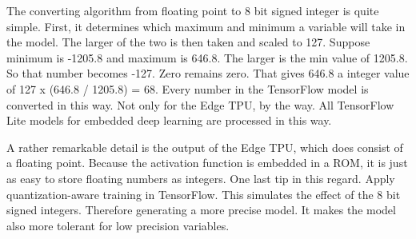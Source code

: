The converting algorithm from floating point to 8 bit signed integer is quite simple. First, it determines which maximum and minimum a variable will take in the model. The larger of the two is then taken and scaled to 127. Suppose minimum is -1205.8 and maximum is 646.8. The larger is the min value of 1205.8. So that number becomes -127. Zero remains zero. That gives 646.8 a integer value of 127 x (646.8 / 1205.8)  = 68. Every number in the TensorFlow model is converted in this way. Not only for the Edge TPU, by the way. All TensorFlow Lite models for embedded deep learning are processed in this way.

A rather remarkable detail is the output of the Edge TPU, which does consist of a floating point.
Because the activation function is embedded in a ROM, it is just as easy to store floating numbers as integers.
One last tip in this regard. Apply quantization-aware training in TensorFlow. This simulates the effect of the 8 bit signed integers. Therefore generating a more precise model. It makes the model also more tolerant for low precision variables.







